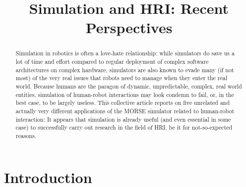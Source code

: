 \documentclass[conference]{IEEEtran}
\begin{document}
\title{Simulation and HRI: Recent Perspectives}

\author{}


\maketitle

\begin{abstract}
Simulation in robotics is often a love-hate relationship: while simulators do save us a lot of time and
effort compared to regular deployment of complex software architectures on complex hardware,
simulators are also known to evade many (if not most) of the very real issues that robots need to manage
when they enter the real world.
Because humans are the paragon of dynamic, unpredictable, complex, real world entities, simulation of
human-robot interactions may look condemn to fail, or, in the best case, to be largely useless.
This collective article reports on five unrelated and actually very different applications of the MORSE
simulator related to human-robot interaction: It appears that simulation is already useful (and even
essential in some case) to successfully carry out research in the field of HRI, be it for not-so-expected
reasons.
\end{abstract}

\IEEEpeerreviewmaketitle

\section{Introduction}
\end{document}
